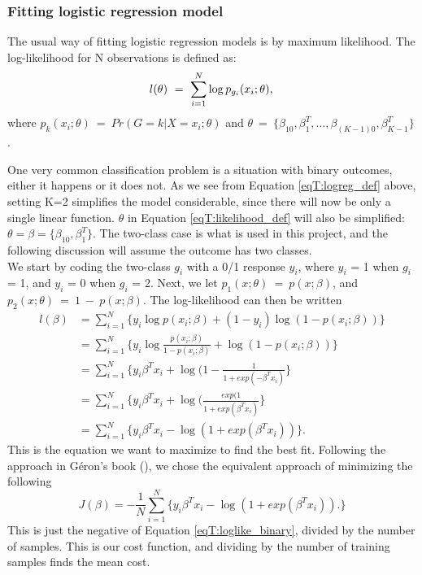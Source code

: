 \subsubsection{Fitting logistic regression model}
The usual way of fitting logistic regression models is by maximum likelihood. The log-likelihood for N observations is defined as:\\
\begin{equation}\label{eqT:likelihood_def}
l(\theta)\ =\ \sum_{i=1}^{N}\log p_{g_i}(x_i;\theta),\\
\end{equation}
where $p_k(x_i;\theta)\ =\ Pr(G=k|X=x_i;\theta)$ and $\theta\ =\ \{\beta_{10}, \beta_1^T,\dots, \beta_{(K-1)0}, \beta_{K-1}^T\}$.

One very common classification problem is a situation with binary outcomes, either it happens or it does not. As we see from Equation \ref{eqT:logreg_def} above, setting K=2 simplifies the model considerable, since there will now be only a single linear function. $\theta$ in Equation \ref{eqT:likelihood_def} will also be simplified: $\theta = \beta = \{\beta_{10}, \beta_1^T\}$. The two-class case is what is used in this project, and the following discussion will assume the outcome has two classes.\\
We start by coding the two-class $g_i$ with a 0/1 response $y_i$, where $y_i$ = 1 when $g_i$ = 1, and $y_i$ = 0 when $g_i$ = 2. Next, we let $p_1(x;\theta)\ =\ p(x;\beta)$, and $p_2(x;\theta)\ =\ 1\ -\ p(x;\beta)$. The log-likelihood can then be written
\begin{equation}\label{eqT:loglike_binary}
\begin{split}
l(\beta) &= \sum_{i=1}^N\{y_i\log p(x_i;\beta)+(1-y_i)\log(1-p(x_i;\beta))\}\\
 &= \sum_{i=1}^N\{y_i\log\frac{p(x_i;\beta)}{1-p(x_i;\beta)}+\log(1-p(x_i;\beta))\}\\
 &= \sum_{i=1}^N\{y_i\beta^Tx_i + \log(1-\frac{1}{1+exp(-\beta^Tx_i)}\}\\
 &= \sum_{i=1}^N\{y_i\beta^Tx_i + \log(\frac{exp(1}{1+exp(\beta^Tx_i)}\}\\
 &= \sum_{i=1}^N\{y_i\beta^Tx_i - \log(1+exp(\beta^Tx_i))\}.
\end{split}
\end{equation}
This is the equation we want to maximize to find the best fit. Following the approach in Géron's book (), we chose the equivalent approach of minimizing the following\\
\begin{equation}\label{Geron_cost}
J(\beta) = -\frac{1}{N}\sum_{i=1}^N\{y_i\beta^Tx_i - \log(1+exp(\beta^Tx_i)).\}
\end{equation}
This is just the negative of Equation \ref{eqT:loglike_binary}, divided by the number of samples. This is our cost function, and dividing by the number of training samples finds the mean cost.

